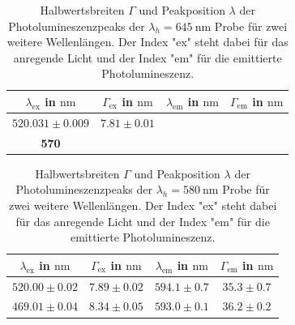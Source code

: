 \begin{table}[H]
  \centering
  \caption{Halbwertsbreiten $\Gamma$ und Peakposition $\lambda$ der Photolumineszenzpeaks der $\lambda_h = \SI{645}{\nano\meter}$ Probe für zwei weitere Wellenlängen. Der Index "ex" steht dabei für das anregende Licht und der Index "em" für die emittierte Photolumineszenz.}
  \label{tab:weisslicht1}
\begin{tabular}{c|c|c|c}
  \toprule
     $\lambda_{\text{ex}}$ in $\si{\nano\meter}$ & $\Gamma_{\text{ex}}$ in $\si{\nano\meter}$ & $\lambda_{\text{em}}$ in $\si{\nano\meter}$ & $\Gamma_{\text{em}}$ in $\si{\nano\meter}$ \\
     \midrule
     $520.031 \pm 0.009$ & $7.81 \pm 0.01$ &   &  \\
     \textbf{570} &                &     &    \\
  \bottomrule
\end{tabular}
\end{table}

\begin{table}[H]
  \centering
  \caption{Halbwertsbreiten $\Gamma$ und Peakposition $\lambda$ der Photolumineszenzpeaks der $\lambda_h = \SI{580}{\nano\meter}$ Probe für zwei weitere Wellenlängen. Der Index "ex" steht dabei für das anregende Licht und der Index "em" für die emittierte Photolumineszenz.}
  \label{tab:weisslicht2}
\begin{tabular}{c|c|c|c}
  \toprule
     $\lambda_{\text{ex}}$ in $\si{\nano\meter}$ & $\Gamma_{\text{ex}}$ in $\si{\nano\meter}$ & $\lambda_{\text{em}}$ in $\si{\nano\meter}$ & $\Gamma_{\text{em}}$ in $\si{\nano\meter}$ \\
  \midrule
  $520.00 \pm 0.02$ & $7.89 \pm 0.02 $ & $594.1 \pm 0.7 $ & $35.3 \pm 0.7$ \\
  $469.01 \pm 0.04$ & $8.34 \pm 0.05 $ & $593.0 \pm 0.1 $ & $36.2 \pm 0.2$ \\
   \bottomrule
\end{tabular}
\end{table}

